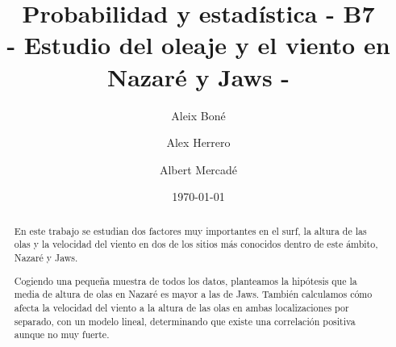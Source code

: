 

\geometry{margin=1in}

\title{
   Probabilidad y estadística - B7 \\
   \large 
   - Estudio del oleaje y el viento en Nazaré y Jaws -
}
\author{
  Aleix Boné \and
  Alex Herrero \and
  Albert Mercadé
}
\date{
  \today
}


\maketitle

\begin{abstract}

En este trabajo se estudian dos factores muy importantes en el surf, la altura de las olas y la velocidad 
del viento en dos de los sitios más conocidos dentro de este ámbito, Nazaré y Jaws. 


Cogiendo una pequeña muestra de todos los datos, planteamos la hipótesis que la media de altura de olas
en Nazaré es mayor a las de Jaws.
También calculamos cómo afecta la velocidad del viento a la altura de las olas en ambas localizaciones 
por separado, con un modelo lineal, determinando que existe una correlación positiva aunque no muy fuerte.

\end{abstract}

